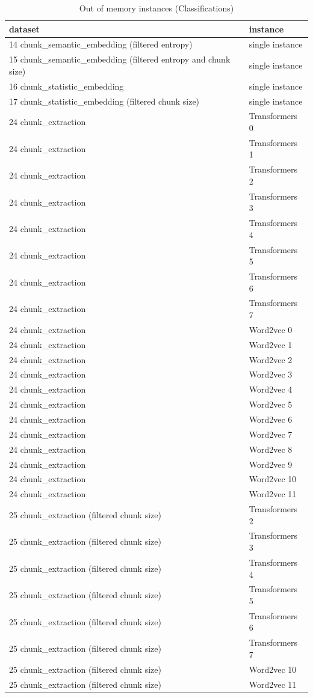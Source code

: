 \begin{table}[H]
\centering
\begin{tabular}{ll}
\hline
dataset & instance \\ 
\hline
14 chunk\_semantic\_embedding (filtered entropy) & single instance \\ 
15 chunk\_semantic\_embedding (filtered entropy and chunk size) & single instance \\ 
16 chunk\_statistic\_embedding & single instance \\ 
17 chunk\_statistic\_embedding (filtered chunk size) & single instance \\ 
24 chunk\_extraction & Transformers 0 \\ 
24 chunk\_extraction & Transformers 1 \\ 
24 chunk\_extraction & Transformers 2 \\ 
24 chunk\_extraction & Transformers 3 \\ 
24 chunk\_extraction & Transformers 4 \\ 
24 chunk\_extraction & Transformers 5 \\ 
24 chunk\_extraction & Transformers 6 \\ 
24 chunk\_extraction & Transformers 7 \\ 
24 chunk\_extraction & Word2vec 0 \\ 
24 chunk\_extraction & Word2vec 1 \\ 
24 chunk\_extraction & Word2vec 2 \\ 
24 chunk\_extraction & Word2vec 3 \\ 
24 chunk\_extraction & Word2vec 4 \\ 
24 chunk\_extraction & Word2vec 5 \\ 
24 chunk\_extraction & Word2vec 6 \\ 
24 chunk\_extraction & Word2vec 7 \\ 
24 chunk\_extraction & Word2vec 8 \\ 
24 chunk\_extraction & Word2vec 9 \\ 
24 chunk\_extraction & Word2vec 10 \\ 
24 chunk\_extraction & Word2vec 11 \\ 
25 chunk\_extraction (filtered chunk size) & Transformers 2 \\ 
25 chunk\_extraction (filtered chunk size) & Transformers 3 \\ 
25 chunk\_extraction (filtered chunk size) & Transformers 4 \\ 
25 chunk\_extraction (filtered chunk size) & Transformers 5 \\ 
25 chunk\_extraction (filtered chunk size) & Transformers 6 \\ 
25 chunk\_extraction (filtered chunk size) & Transformers 7 \\ 
25 chunk\_extraction (filtered chunk size) & Word2vec 10 \\ 
25 chunk\_extraction (filtered chunk size) & Word2vec 11 \\ 
\hline
\end{tabular}
\caption{Out of memory instances (Classifications)}
\label{tab:annexe:out_of_memory_instances_classifications}
\end{table}

